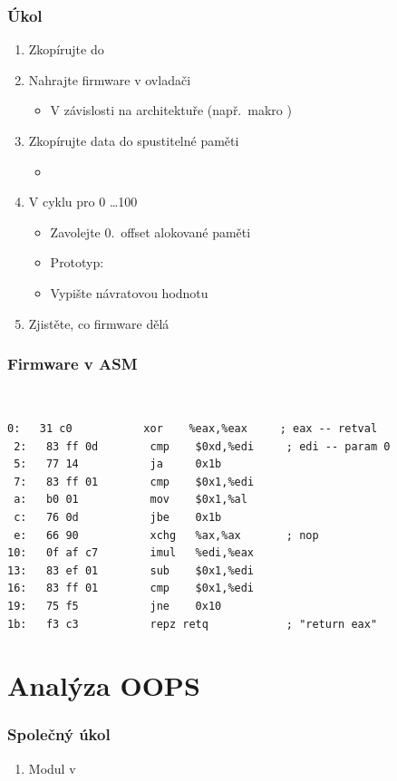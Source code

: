 \begin{frame}
  \frametitle{Úkol}

  \begin{enumerate}
    \item Zkopírujte  do 
    \item Nahrajte firmware v ovladači
    \begin{itemize}
      \item V závislosti na architektuře (např.\ makro )
    \end{itemize}

    \item Zkopírujte data do spustitelné paměti
    \begin{itemize}
      \item {}
    \end{itemize}

    \item V cyklu pro 0 \dots 100
    \begin{itemize}
      \item Zavolejte 0.\ offset alokované paměti
      \item Prototyp: 
      \item Vypište návratovou hodnotu
    \end{itemize}

    \item Zjistěte, co firmware dělá
  \end{enumerate}

\end{frame}

\begin{frame}[fragile]
  \frametitle{Firmware v ASM}

  \small{} \\
  \begin{lstlisting}[language={[x86masm]Assembler}]
 0:   31 c0           xor    %eax,%eax     ; eax -- retval
 2:   83 ff 0d        cmp    $0xd,%edi     ; edi -- param 0
 5:   77 14           ja     0x1b
 7:   83 ff 01        cmp    $0x1,%edi
 a:   b0 01           mov    $0x1,%al
 c:   76 0d           jbe    0x1b
 e:   66 90           xchg   %ax,%ax       ; nop
10:   0f af c7        imul   %edi,%eax
13:   83 ef 01        sub    $0x1,%edi
16:   83 ff 01        cmp    $0x1,%edi
19:   75 f5           jne    0x10
1b:   f3 c3           repz retq            ; "return eax"
  \end{lstlisting} %

\end{frame}

\section{Analýza OOPS}
\frame{\sectionpage}

\begin{frame}
  \frametitle{Společný úkol}

  \begin{enumerate}
    \item Modul v 
  \end{enumerate}

\end{frame}
